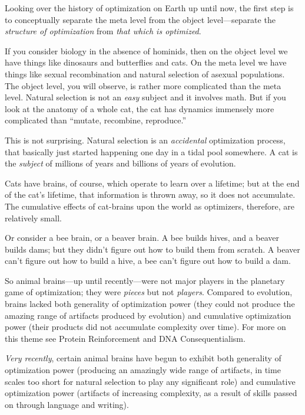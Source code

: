 {
 Looking over the history of optimization on Earth up until now,
the first step is to conceptually separate the meta level from the
object level---separate the \textit{structure of optimization} from
\textit{that which is optimized}.}

{
 If you consider biology in the absence of hominids, then on the
object level we have things like dinosaurs and butterflies and cats. On
the meta level we have things like sexual recombination and natural
selection of asexual populations. The object level, you will observe,
is rather more complicated than the meta level. Natural selection is
not an \textit{easy} subject and it involves math. But if you look at
the anatomy of a whole cat, the cat has dynamics immensely more
complicated than ``mutate, recombine,
reproduce.''}

{
 This is not surprising. Natural selection is an
\textit{accidental} optimization process, that basically just started
happening one day in a tidal pool somewhere. A cat is the
\textit{subject} of millions of years and billions of years of
evolution.}

{
 Cats have brains, of course, which operate to learn over a
lifetime; but at the end of the cat's lifetime, that
information is thrown away, so it does not accumulate. The cumulative
effects of cat-brains upon the world as optimizers, therefore, are
relatively small.}

{
 Or consider a bee brain, or a beaver brain. A bee builds hives,
and a beaver builds dams; but they didn't figure out
how to build them from scratch. A beaver can't figure
out how to build a hive, a bee can't figure out how to
build a dam.}

{
 So animal brains---up until recently---were not major players in
the planetary game of optimization; they were \textit{pieces} but not
\textit{players}. Compared to evolution, brains lacked both generality
of optimization power (they could not produce the amazing range of
artifacts produced by evolution) and cumulative optimization power
(their products did not accumulate complexity over time). For more on
this theme see Protein Reinforcement and DNA Consequentialism.}

{
 \textit{Very recently}, certain animal brains have begun to
exhibit both generality of optimization power (producing an amazingly
wide range of artifacts, in time scales too short for natural selection
to play any significant role) and cumulative optimization power
(artifacts of increasing complexity, as a result of skills passed on
through language and writing).}

